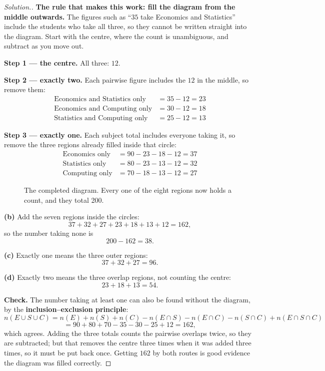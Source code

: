 \documentclass[11pt,a4paper]{article}
\theoremstyle{definition}
\newenvironment{solution}
  {\renewcommand{\qedsymbol}{}\begin{proof}[\textit{Solution}.]}
  {\end{proof}}
\begin{document}
\begin{solution}
\textbf{The rule that makes this work: fill the diagram from the middle outwards.}
The figures such as ``$35$ take Economics and Statistics'' include the students who
take all three, so they cannot be written straight into the diagram. Start with the
centre, where the count is unambiguous, and subtract as you move out.

\textbf{Step 1 --- the centre.} All three: $12$.

\textbf{Step 2 --- exactly two.} Each pairwise figure includes the $12$ in the middle,
so remove them:
\begin{align*}
\text{Economics and Statistics only} &= 35-12 = 23\\
\text{Economics and Computing only} &= 30-12 = 18\\
\text{Statistics and Computing only} &= 25-12 = 13
\end{align*}

\textbf{Step 3 --- exactly one.} Each subject total includes everyone taking it,
so remove the three regions already filled inside that circle:
\begin{align*}
\text{Economics only} &= 90-23-18-12 = 37\\
\text{Statistics only} &= 80-23-13-12 = 32\\
\text{Computing only} &= 70-18-13-12 = 27
\end{align*}

\begin{figure}[H]
\centering
{}
\caption{The completed diagram. Every one of the eight regions now holds a count, and they total 200.}
\end{figure}

\textbf{(b)} Add the seven regions inside the circles:
$$37+32+27+23+18+13+12=162,$$
so the number taking none is
$$200-162=38.$$

\textbf{(c)} Exactly one means the three outer regions:
$$37+32+27=96.$$

\textbf{(d)} Exactly two means the three overlap regions, not counting the centre:
$$23+18+13=54.$$

\textbf{Check.} The number taking at least one can also be found without the diagram,
by the \textbf{inclusion--exclusion principle}:
$$n(E\cup S\cup C)=n(E)+n(S)+n(C)-n(E\cap S)-n(E\cap C)-n(S\cap C)+n(E\cap S\cap C)$$
$$=90+80+70-35-30-25+12=162,$$
which agrees. Adding the three totals counts the pairwise overlaps twice, so they are
subtracted; but that removes the centre three times when it was added three times, so
it must be put back once. Getting $162$ by both routes is good evidence the diagram
was filled correctly.
\end{solution}
\end{document}
